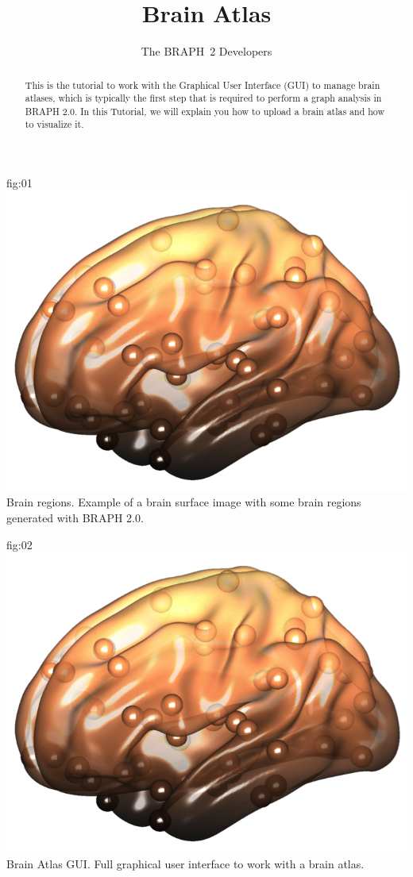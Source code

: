 \documentclass{tufte-handout}
\title{Brain Atlas}
\author[The BRAPH~2 Developers]{The BRAPH~2 Developers}
\begin{document}
\maketitle
	
	{fig:01}
	{\includegraphics{tut_ba/fig0.png}}
	{Brain regions.}
	{
	Example of a brain surface image with some brain regions generated with BRAPH 2.0.
	}

\begin{abstract}
\noindent
This is the tutorial to work with the Graphical User Interface (GUI) to manage brain atlases, which is typically the first step that is required to perform a graph analysis in BRAPH 2.0. 
In this Tutorial, we will explain you how to upload a brain atlas and how to visualize it.
\end{abstract}

\tableofcontents

	{fig:02}
	{\includegraphics[height=10cm]{tut_ba/fig1.png}}
	{Brain Atlas GUI.}
	{
	Full graphical user interface to work with a brain atlas. 
	}
\end{document}
